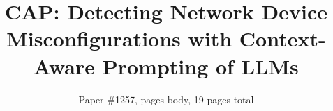 \documentclass[acmsmall]{acmart}
\begin{document}


	\title[CAP]{CAP: Detecting Network Device Misconfigurations with Context-Aware Prompting of LLMs}
		\author{Paper \#1257, \pageref{endOfBody} pages body, 19 pages total}
        
		\newcommand{\chase}[1]{\textcolor{blue}{[#1]}}
		\newcommand{\eg}{{\it e.g.}}
		\newcommand{\ie}{{\it i.e.}}
		\newcommand{\aaron}[1]{{\color{teal}{(Aaron: #1)}}}
		\newcommand{\mypara}[1]{\vspace{0.05cm}\noindent{\bf {#1}}}
		\newcommand{\mysubpara}[1]{\vspace{0.05cm}\noindent{\textit{#1}}}
		\newcommand{\etal}{{\it et al.}}
		\newcommand{\sysname}{{CAP}}
		\newlength{\oldintextsep}
		\setlength{\oldintextsep}{\intextsep}
		\setlength\intextsep{0pt}

        		\maketitle









		\label{endOfBody}
		
		
        

		\normalfont %
	
	
\end{document}

